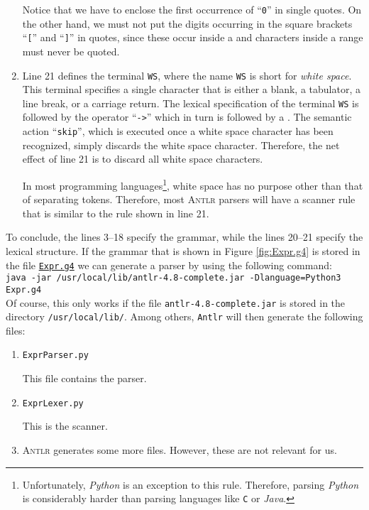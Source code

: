 \begin{enumerate}
      Notice that we have to enclose the first occurrence of ``\texttt{0}'' in single quotes.
      On the other hand, we must not put the digits occurring in the square brackets ``\texttt{[}'' 
      and ``\texttt{]}'' in quotes, since these occur inside a  and characters inside a range
      must never be quoted.
\item Line 21 defines the terminal \texttt{WS}, where the name \texttt{WS} is short for \emph{white space}. This terminal
      specifies a single character that is either a blank, a tabulator, a line break, or a carriage return.
      The lexical specification of the terminal \texttt{WS} is followed by the operator ``\texttt{->}'' 
      which in turn is followed by a .
      The semantic action ``\texttt{skip}'', which is executed once a white space character has been recognized, 
      simply discards the white space character.  Therefore, the net effect of line 21 is to discard all white
      space characters. 

      In most programming languages\footnote{
        Unfortunately, \textsl{Python} is an exception to this rule.  Therefore, parsing
        \textsl{Python} is considerably harder than parsing languages like \texttt{C} or \textsl{Java}.
      }, white space has no purpose other than that of separating  tokens.  
      Therefore, most \textsc{Antlr} parsers will have a scanner rule that is similar to
      the rule shown in line 21. 
\end{enumerate}
To conclude, the lines 3--18 specify the grammar, while the lines 20--21 specify the 
lexical structure.  If the grammar that is shown in Figure \ref{fig:Expr.g4} is stored in the file
\href{https://github.com/karlstroetmann/Formal-Languages/blob/master/ANTLR4-Python/PureExprParser/Expr.g4}{\texttt{Expr.g4}} 
we can generate a parser by using the following command:
\\[0.2cm]
\hspace*{1.3cm}
\texttt{java -jar /usr/local/lib/antlr-4.8-complete.jar -Dlanguage=Python3 Expr.g4}
\\[0.2cm]
Of course, this only works if the file \texttt{antlr-4.8-complete.jar} is stored in the directory
\texttt{/usr/local/lib/}.  Among others, \texttt{Antlr} will then generate the following files:
\begin{enumerate}
\item \texttt{ExprParser.py}

      This file contains the parser.
\item \texttt{ExprLexer.py}

      This is the scanner.
\item \textsc{Antlr} generates some more files.  However, these are not relevant for us.
\end{enumerate}

